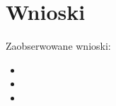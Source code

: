 \section{Wnioski}

Zaobserwowane wnioski:
\begin{itemize}
	\item \dotfill
	\item \dotfill
	\item \dotfill
\end{itemize}